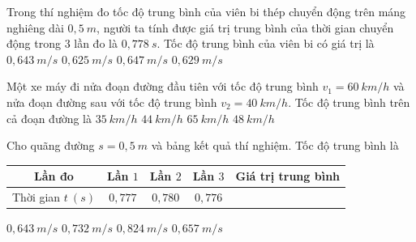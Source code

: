 \begin{ex}%
Trong thí nghiệm đo tốc độ trung bình của viên bi thép chuyển động trên máng nghiêng dài $0,5\ m$, người ta tính được giá trị trung bình của thời gian chuyển động trong $3$ lần đo là $0,778\ s$. Tốc độ trung bình của viên bi có giá trị là
\choice
{\True $0,643\ m/s$}
{$0,625\ m/s$}
{$0,647\ m/s$}
{$0,629\ m/s$}
\loigiai{
}
\end{ex}
\begin{ex}%
Một xe máy đi nửa đoạn đường đầu tiên với tốc độ trung bình $v_1 = 60\ km/h$ và nửa đoạn đường sau với tốc độ trung bình $v_2 = 40\ km/h$. Tốc độ trung bình trên cả đoạn đường là
\choice
{$35\ km/h$}
{$44\ km/h$}
{$65\ km/h$}
{\True $48\ km/h$}

\end{ex}
\begin{ex}
Cho quãng đường $s=0,5\ m$ và bảng kết quả thí nghiệm. Tốc độ trung bình là
\begin{center}
\begin{tabular}{|c|c|c|c|c|}
\hline
Lần đo & Lần $1$ & Lần $2$ & Lần $3$ & Giá trị trung bình \\
\hline
Thời gian $t\ (s)$ & $0,777$ & $0,780$ & $0,776$ &  \\
\hline
\end{tabular}
\end{center}

\choice
{\True $0,643\ m/s$}
{$0,732\ m/s$}
{$0,824\ m/s$}
{$0,657\ m/s$}
\loigiai{
}
\end{ex}
